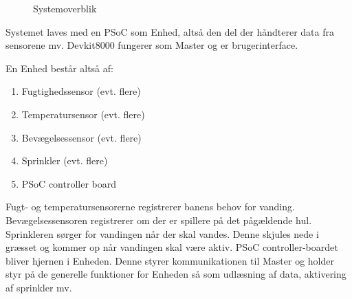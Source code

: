 \begin{figure}[ht] \centering
{}
\caption{Systemoverblik}
\label{fig:bloksystemoverblik}
\end{figure}



Systemet laves med en PSoC som Enhed, altså den del der håndterer data fra sensorene mv.
Devkit8000 fungerer som Master og er brugerinterface.

En Enhed består altså af:
\begin{enumerate}
\item Fugtighedssensor (evt. flere)
\item Temperatursensor (evt. flere)
\item Bevægelsessensor (evt. flere)
\item Sprinkler (evt. flere)
\item PSoC controller board
\end{enumerate}

Fugt- og temperatursensorerne registrerer banens behov for vanding. Bevægelsessensoren registrerer om der er spillere på det pågældende hul. Sprinkleren sørger for vandingen når der skal vandes. Denne skjules nede i græsset og kommer op når vandingen skal være aktiv.
PSoC controller-boardet bliver hjernen i Enheden. Denne styrer kommunikationen til Master og holder styr på de generelle funktioner for Enheden så som udlæsning af data, aktivering af sprinkler mv.